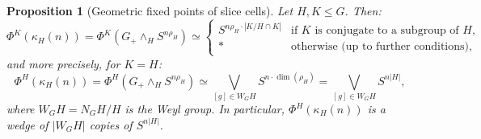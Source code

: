 \documentclass[12pt]{article}
\newtheorem{proposition}[theorem]{Proposition}
\theoremstyle{definition}
\begin{document}
\begin{proposition}[Geometric fixed points of slice cells]\label{prop:gfp-slice-cell}
Let $H, K \leq G$.  Then:
\[
   \Phi^K(\kappa_H(n)) = \Phi^K(G_+\wedge_H S^{n\rho_H}) \simeq \begin{cases}
      S^{n\rho_H \cdot |K/H \cap K|} & \text{if } K \text{ is conjugate to a subgroup of } H,\\
      * & \text{otherwise (up to further conditions),}
   \end{cases}
\]
and more precisely, for $K = H$:
\[
   \Phi^H(\kappa_H(n)) = \Phi^H(G_+\wedge_H S^{n\rho_H}) \simeq \bigvee_{[g]\in W_G H} S^{n \cdot \dim(\rho_H)} = \bigvee_{[g]\in W_G H} S^{n|H|},
\]
where $W_G H = N_G H / H$ is the Weyl group.  In particular, $\Phi^H(\kappa_H(n))$ is a wedge of $|W_G H|$ copies of $S^{n|H|}$.
\end{proposition}
\end{document}
